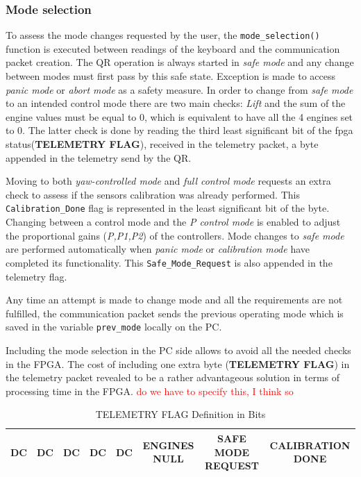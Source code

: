 \documentclass{article}
\newcommand\worries[1]{\textcolor{red}{#1}} %
\begin{document}
\subsubsection{Mode selection}
\label{sec:modeselection}
To assess the mode changes requested by the user, the \texttt{mode\_selection()} function is executed between readings of the keyboard and the communication packet creation. The QR operation is always started in \textit{safe mode} and any change between modes must first pass by this safe state. Exception is made to access \textit{panic mode} or \textit{abort mode} as a safety measure. In order to change from \textit{safe mode} to an intended control mode there are two main checks: \textit{Lift} and the sum of the engine values must be equal to $0$, which is equivalent to have all the 4 engines set to $0$. The latter check is done by reading the third least significant bit of the fpga status(\textbf{TELEMETRY FLAG}), received in the telemetry packet, a byte appended in the telemetry send by the QR. 

Moving to both \textit{yaw-controlled mode} and \textit{full control mode} requests an extra check to assess if the sensors calibration was already performed. This \texttt{Calibration\_Done} flag is represented in the least significant bit of the byte. Changing between a control mode and the \textit{P control mode} is enabled to adjust the proportional gains (\textit{P,P1,P2}) of the controllers. Mode changes to \textit{safe mode} are performed automatically when \textit{panic mode} or \textit{calibration mode} have completed its functionality. This \texttt{Safe\_Mode\_Request} is also appended in the telemetry flag. 

Any time an attempt is made to change mode and all the requirements are not fulfilled, the communication packet sends the previous operating mode which is saved in the variable \texttt{prev\_mode} locally on the PC.

Including the mode selection in the PC side allows to avoid all the needed checks in the FPGA. The cost of including one extra byte (\textbf{TELEMETRY FLAG}) in the telemetry packet revealed to be a rather advantageous solution in terms of processing time in the FPGA. \worries{do we have to specify this, I think so}

\begin{table}[h]
\centering
\begin{tabular}{|c|c|c|c|c|c|c|c|}
\hline 
DC & DC & DC & DC & DC & ENGINES NULL & SAFE MODE REQUEST & CALIBRATION DONE \\
\hline 
\end{tabular} 
\caption{TELEMETRY FLAG Definition in Bits}
\label{tbl:TelFlagDef}
\end{table}
\end{document}
